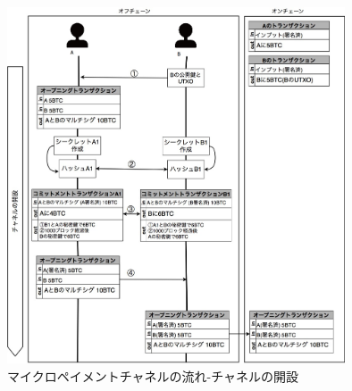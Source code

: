 \documentclass[12pt]{jarticle}
\begin{document}
\begin{figure}[h]
 \centering
   \includegraphics[width=100mm]{figures/maicrochanelpart1.jpg}
 \caption{マイクロペイメントチャネルの流れ-チャネルの開設}
 \label{chanel}
\end{figure}
\end{document}

